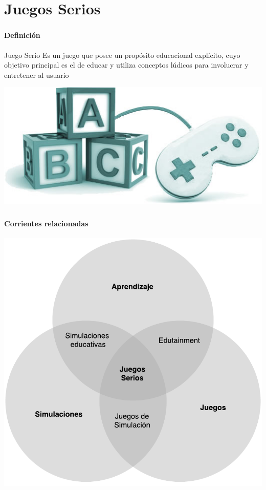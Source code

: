 
\section{Juegos Serios}
\setcounter{sectiontotal}{6}

\begin{frame}
    \frametitle{\pagetitle}
    \framesubtitle{Definición}
    \begin{block}{Juego Serio}
    \centering
    Es un juego que posee un propósito educacional explícito, cuyo objetivo
    principal es el de educar y utiliza conceptos lúdicos para involucrar y
    entretener al usuario
    \end{block}   
    \begin{center}
    \includegraphics[scale=.5]{imagenes/juegos_educacion}
    \end{center}
\end{frame}


\begin{frame}
    \frametitle{\pagetitle}
    \framesubtitle{Corrientes relacionadas}
    \centering
    \includegraphics[scale=.5]{../juegos_serios/corrientes_paralelas.pdf}
\end{frame}

